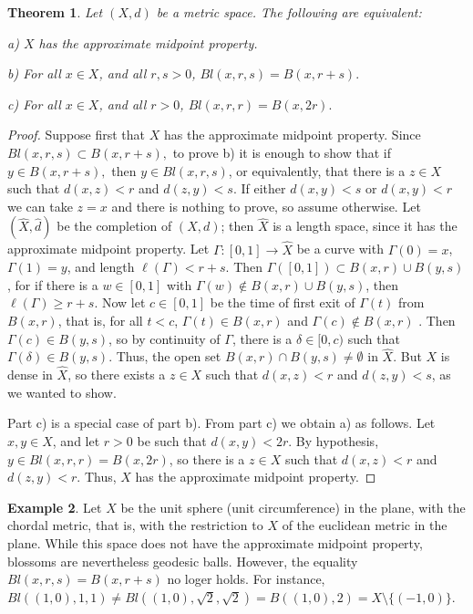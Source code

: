 \documentclass[12pt]{amsart}
\newtheorem{theorem}{Theorem}[section]
\theoremstyle{definition}
\newtheorem{example}[theorem]{Example}
\theoremstyle{parrafo}
\begin{document}
 \begin{theorem} \label{equiv}  Let $(X, d)$ be a metric space. The following are equivalent:

a)  $X$ has the approximate midpoint property.

b) For all $x\in X$, and all $r, s >0$, 
$Bl(x, r, s)  =  B(x, r + s).$

c) For all $x\in X$, and all $r >0$, 
$Bl(x, r, r)  =  B(x, 2 r).$
\end{theorem}

\begin{proof} Suppose first that  $X$ has the approximate midpoint property.
Since $Bl(x, r, s)  \subset  B(x, r + s),$ to prove b) it is enough to show that if
$y\in  B(x, r +  s),$ then $y \in  Bl(x, r, s)$, or equivalently, that
there is a $z\in X$ such that $d(x, z) < r$ and $d(z, y) < s$. 
If  either $d(x, y) < s$ or  $d(x, y) < r$ we can take $z = x$ and there is nothing to prove, so assume otherwise.
Let  $(\hat X,  \hat d)$ be the completion of  $(X, d)$; then $\hat X$ is a length space, since it
has the approximate midpoint property.  Let $\Gamma :[0,1] \to \hat X$ be a curve with $\Gamma (0) = x$, 
$\Gamma (1) = y$, and length $\ell (\Gamma) < r + s$. Then $\Gamma([0, 1]) \subset B(x, r) \cup B(y, s)$, 
for if there is a $w \in [0,1]$ with $\Gamma (w) \notin  B(x, r) \cup B(y, s)$, then $\ell (\Gamma)  \ge r + s$. 
Now let $c \in [0,1]$ be the time of first exit of $\Gamma (t)$ from $B(x,r)$, that is, for all $t < c$, 
 $\Gamma (t) \in B(x,r)$ and $\Gamma (c) \notin B(x,r)$ . Then $\Gamma (c) \in B(y,s)$, so by continuity of $\Gamma$, 
there is
a $\delta \in [0, c) $ such that  $\Gamma (\delta) \in B(y,s)$. Thus, the open set 
$ B(x, r) \cap B(y, s) \ne \emptyset$ in $\hat X$. But $X$ is dense in $\hat X$, so 
there exists a $z\in X$ such that $d(x, z) < r$ and $d(z, y) < s$, as we wanted to show.


Part c) is a special case of part b). From part c) we obtain a) as follows. Let $x, y \in X$, and let $r >0$ be such that $d(x,y) < 2 r$. By
hypothesis, $y\in Bl(x, r, r) = B(x, 2r)$, so there is a $z\in X$ such that $d(x, z) < r$ and  $d(z, y) < r$.
Thus, $X$ has the approximate midpoint property.
\end{proof}

\begin{example} \label{chordal} Let $X$ be the unit sphere (unit circumference) in the plane, with the chordal metric,
that is, with the restriction to $X$ of the euclidean metric in the plane. While this space does not
have the approximate midpoint property, blossoms are nevertheless geodesic balls.
However, the equality 
$Bl(x, r, s)  =  B(x, r + s)$ no loger holds. For instance,
 $Bl((1, 0), 1, 1) \ne Bl((1, 0), \sqrt2, \sqrt2 )  = B((1, 0), 2) = X \setminus \{(-1,0)\}$.
 \end{example}
\end{document}
